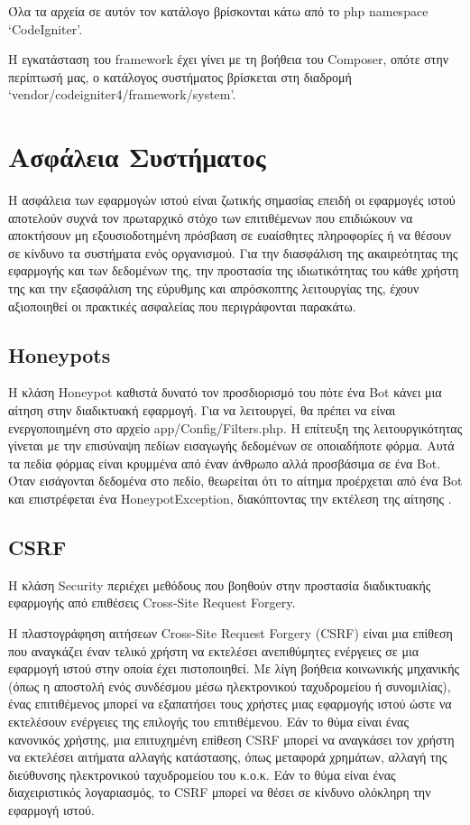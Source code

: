 Όλα τα αρχεία σε αυτόν τον κατάλογο βρίσκονται κάτω από το php namespace `CodeIgniter'.

Η εγκατάσταση του framework έχει γίνει με τη βοήθεια του Composer, οπότε στην περίπτωσή μας, ο κατάλογος συστήματος βρίσκεται στη διαδρομή `vendor/codeigniter4/framework/system'.

\section{Ασφάλεια Συστήματος}
Η ασφάλεια των εφαρμογών ιστού είναι ζωτικής σημασίας επειδή οι εφαρμογές ιστού αποτελούν συχνά τον πρωταρχικό στόχο των επιτιθέμενων που επιδιώκουν να αποκτήσουν μη εξουσιοδοτημένη πρόσβαση σε ευαίσθητες πληροφορίες ή να θέσουν σε κίνδυνο τα συστήματα ενός οργανισμού. Για την διασφάλιση της ακαιρεότητας της εφαρμογής και των δεδομένων της, την προστασία της ιδιωτικότητας του κάθε χρήστη της και την εξασφάλιση της εύρυθμης και απρόσκοπτης λειτουργίας της, έχουν αξιοποιηθεί οι πρακτικές ασφαλείας που περιγράφονται παρακάτω.

\subsection{Honeypots}
Η κλάση Honeypot καθιστά δυνατό τον προσδιορισμό του πότε ένα Bot κάνει μια αίτηση στην διαδικτυακή εφαρμογή. Για να λειτουργεί, θα πρέπει να είναι ενεργοποιημένη στο αρχείο app/Config/Filters.php. Η επίτευξη της λειτουργικότητας γίνεται με την επισύναψη πεδίων εισαγωγής δεδομένων σε οποιαδήποτε φόρμα. Αυτά τα πεδία φόρμας είναι κρυμμένα από έναν άνθρωπο αλλά προσβάσιμα σε ένα Bot. Όταν εισάγονται δεδομένα στο πεδίο, θεωρείται ότι το αίτημα προέρχεται από ένα Bot και επιστρέφεται ένα HoneypotException, διακόπτοντας την εκτέλεση της αίτησης \cite{CodeIgniter_honeypots}.

\subsection{CSRF}
Η κλάση Security περιέχει μεθόδους που βοηθούν στην προστασία διαδικτυακής εφαρμογής από επιθέσεις Cross-Site Request Forgery.

Η πλαστογράφηση αιτήσεων Cross-Site Request Forgery (CSRF) είναι μια επίθεση που αναγκάζει έναν τελικό χρήστη να εκτελέσει ανεπιθύμητες ενέργειες σε μια εφαρμογή ιστού στην οποία έχει πιστοποιηθεί. Με λίγη βοήθεια κοινωνικής μηχανικής (όπως η αποστολή ενός συνδέσμου μέσω ηλεκτρονικού ταχυδρομείου ή συνομιλίας), ένας επιτιθέμενος μπορεί να εξαπατήσει τους χρήστες μιας εφαρμογής ιστού ώστε να εκτελέσουν ενέργειες της επιλογής του επιτιθέμενου. Εάν το θύμα είναι ένας κανονικός χρήστης, μια επιτυχημένη επίθεση CSRF μπορεί να αναγκάσει τον χρήστη να εκτελέσει αιτήματα αλλαγής κατάστασης, όπως μεταφορά χρημάτων, αλλαγή της διεύθυνσης ηλεκτρονικού ταχυδρομείου του κ.ο.κ. Εάν το θύμα είναι ένας διαχειριστικός λογαριασμός, το CSRF μπορεί να θέσει σε κίνδυνο ολόκληρη την εφαρμογή ιστού.

